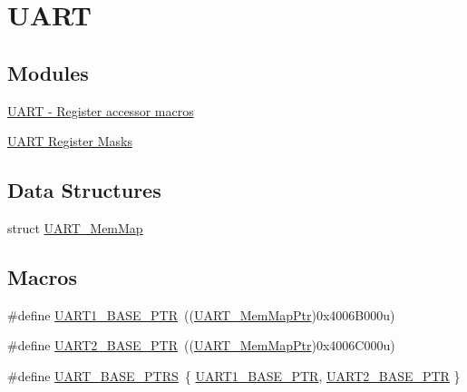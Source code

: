 \hypertarget{group___u_a_r_t___peripheral}{}\section{U\+A\+R\+T}
\label{group___u_a_r_t___peripheral}
\subsection*{Modules}
\begin{DoxyCompactItemize}
\item 
\hyperlink{group___u_a_r_t___register___accessor___macros}{U\+A\+R\+T -\/ Register accessor macros}
\item 
\hyperlink{group___u_a_r_t___register___masks}{U\+A\+R\+T Register Masks}
\end{DoxyCompactItemize}
\subsection*{Data Structures}
\begin{DoxyCompactItemize}
\item 
struct \hyperlink{struct_u_a_r_t___mem_map}{U\+A\+R\+T\+\_\+\+Mem\+Map}
\end{DoxyCompactItemize}
\subsection*{Macros}
\begin{DoxyCompactItemize}
\item 
\#define \hyperlink{group___u_a_r_t___peripheral_gafb5b1236c1cdf2d9a6464251b791030c}{U\+A\+R\+T1\+\_\+\+B\+A\+S\+E\+\_\+\+P\+T\+R}~((\hyperlink{group___u_a_r_t___peripheral_ga306cf44b593fadbb29a065f42e3f68f0}{U\+A\+R\+T\+\_\+\+Mem\+Map\+Ptr})0x4006\+B000u)
\item 
\#define \hyperlink{group___u_a_r_t___peripheral_ga75ca2ea4e490b3c1c7aa55fc9c25cd37}{U\+A\+R\+T2\+\_\+\+B\+A\+S\+E\+\_\+\+P\+T\+R}~((\hyperlink{group___u_a_r_t___peripheral_ga306cf44b593fadbb29a065f42e3f68f0}{U\+A\+R\+T\+\_\+\+Mem\+Map\+Ptr})0x4006\+C000u)
\item 
\#define \hyperlink{group___u_a_r_t___peripheral_ga7b34a38b9492a1e1007b2f66383aef17}{U\+A\+R\+T\+\_\+\+B\+A\+S\+E\+\_\+\+P\+T\+R\+S}~\{ \hyperlink{group___u_a_r_t___peripheral_gafb5b1236c1cdf2d9a6464251b791030c}{U\+A\+R\+T1\+\_\+\+B\+A\+S\+E\+\_\+\+P\+T\+R}, \hyperlink{group___u_a_r_t___peripheral_ga75ca2ea4e490b3c1c7aa55fc9c25cd37}{U\+A\+R\+T2\+\_\+\+B\+A\+S\+E\+\_\+\+P\+T\+R} \}
\end{DoxyCompactItemize}
